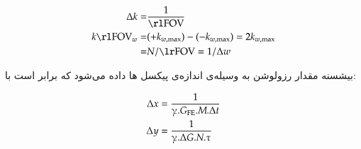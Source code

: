 \begin{figure}[t!]
	\centering
	\begin{copyrightBox}{0.8\linewidth}{\scriptsize{}}
		\hfill
	\end{copyrightBox}
	\removevspace[1]
	\caption{}
\end{figure}



\removevspace
\begin{subequations}\label{eq:FOV-kFOV}
\begin{align}
	\Delta k = & \dfrac{1}{\rltext{FOV}} \\
	 k\rltext{FOV}_w = & (+k_{w,\max}) - (-k_{w,\max}) = 2 k_{w,\max} \\
	 = & N / \lrtext{FOV} = 1 / \Delta w
\end{align}
\end{subequations}

بیشسنه مقدار رزولوشن به وسیله‌ی اندازه‌ی پیکسل ها داده می‌شود که برابر است با:

\removevspace
\begin{subequations}
\begin{align}
\Delta x &= \dfrac{1}{\gammabar . G_\mathrm{FE} . M . \Delta t} \\ 
\Delta y &= \dfrac{1}{\gammabar . \Delta G . N . \tau}
\end{align}
\end{subequations}


